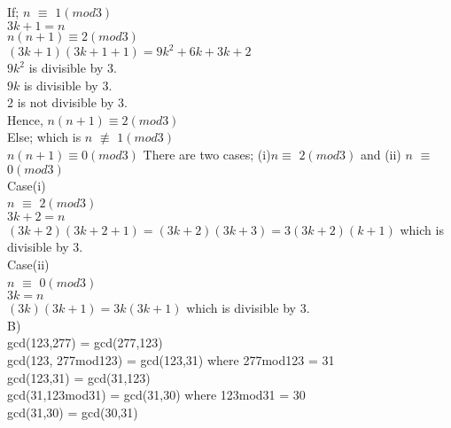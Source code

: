 \documentclass[12pt]{article}
\begin{document}
If; $n$ $\equiv$ $1(mod3)$\\

$3k+1=n$\\

$n(n+1)$$\equiv$$2(mod3)$\\

$(3k+1)(3k+1+1)=9k^2+6k+3k+2$\\

$9k^2$ is divisible by 3.\\

$9k$ is divisible by 3.\\

2 is not divisible by 3.\\

Hence, $n(n+1)$$\equiv$$2(mod3)$\\

Else; which is  $n$ $\not\equiv$ $1(mod3)$\\

 $n(n+1)$$\equiv$$0(mod3)$
There are two cases; (i)$n$$\equiv$ $2(mod3)$ and  (ii) $n$ $\equiv$ $0(mod3)$\\

Case(i)\\ 

$n$ $\equiv$ $2(mod3)$\\

$3k+2=n$\\

$(3k+2)(3k+2+1)=(3k+2)(3k+3) = 3(3k+2)(k+1)$ which is divisible by 3.\\

Case(ii)\\

$n$ $\equiv$ $0(mod3)$\\

$3k=n$\\

$(3k)(3k+1)=3k(3k+1)$ which is divisible by 3.\\
B)\\

gcd(123,277) = gcd(277,123)\\

gcd(123, 277mod123) = gcd(123,31) where 277mod123 = 31\\

gcd(123,31) = gcd(31,123)\\

gcd(31,123mod31) = gcd(31,30) where 123mod31 = 30\\

gcd(31,30) = gcd(30,31)\\
\end{document}
